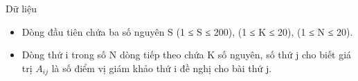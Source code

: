 Dữ liệu
\begin{itemize}
	\item Dòng đầu tiên chứa ba số nguyên S (1 ≤ S ≤ 200), (1 ≤ K ≤ 20), (1 ≤ N ≤ 20).
	\item Dòng thứ i trong số N dòng tiếp theo chứa K số nguyên, số thứ j cho biết giá trị $A_{ij}$ là số điểm vị giám khảo thứ i đề nghị cho bài thứ j.
\end{itemize}